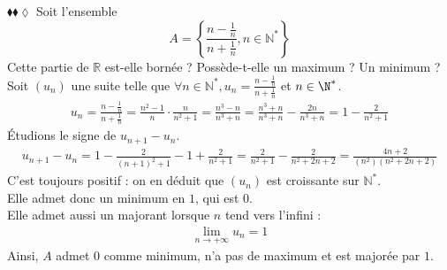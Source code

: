\documentclass[11pt]{article}
\begin{document}
\begin{exercice}{$\blacklozenge\blacklozenge\lozenge$}{}
    Soit l'ensemble 
    \begin{equation*}
        A = \left\{\frac{ n-\frac{1}{n} }{ n+\frac{1}{n}}, n\in\mathbb{N}^* \right\}
    \end{equation*}
    Cette partie de $\mathbb{R}$ est-elle bornée ? Possède-t-elle un maximum ? Un minimum ?
    \tcblower
    Soit $(u_n)$ une suite telle que $\forall{n\in\mathbb{N}^*}, u_n=\frac{n-\frac{1}{n}}{n+\frac{1}{n}}$ et $n\in\N^*$.
    \begin{align*}
        u_n 
        = \frac{n-\frac{1}{n}}{n+\frac{1}{n}} = \frac{n^2-1}{n} \cdot \frac{n}{n^2+1}
        = \frac{n^3-n}{n^3+n} = \frac{n^3+n}{n^3+n}-\frac{2n}{n^3+n}
        = 1 - \frac{2}{n^2+1}
    \end{align*}
    Étudions le signe de $u_{n+1}-u_n$.
    \begin{align*}
        u_{n+1}-u_n
        = 1 - \frac{2}{(n+1)^2+1}-1+\frac{2}{n^2+1}
        = \frac{2}{n^2+1} - \frac{2}{n^2+2n+2}
        = \frac{4n+2}{(n^2)(n^2+2n+2)}
    \end{align*}
    C'est toujours positif : on en déduit que $(u_n)$ est croissante sur $\mathbb{N}^*$.\\
    Elle admet donc un minimum en $1$, qui est $0$.\\
    Elle admet aussi un majorant lorsque $n$ tend vers l'infini :
    \begin{align*}
        \lim_{n\rightarrow+\infty}u_n=1
    \end{align*}
    Ainsi, $A$ admet $0$ comme minimum, n'a pas de maximum et est majorée par $1$.
\end{exercice}

\pagebreak
\end{document}
